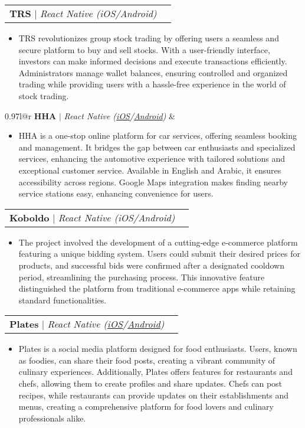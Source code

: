 \documentclass[letterpaper,11pt]{article}
\makeatletter
\newcommand{\resumeItem}[1]{
  \item\small{
    {#1 \vspace{-2pt}}
  }
}
\newcommand{\resumeProjectHeading}[2]{
    \vspace{-2pt}\item
    \begin{tabular*}{0.97\textwidth}{l@{\extracolsep{\fill}}r}
      \small#1 & #2 \\
    \end{tabular*}\vspace{-7pt}
}
\newcommand{\resumeItemListStart}{\begin{itemize}}
\newcommand{\resumeItemListEnd}{\end{itemize}\vspace{-5pt}}
\makeatother
\begin{document}
    \resumeProjectHeading
        {\textbf{TRS} $|$ \emph{{React Native (iOS/Android)}}}{}
          \resumeItemListStart
            \resumeItem{TRS revolutionizes group stock trading by offering users a seamless and secure platform to buy and sell stocks. With a user-friendly interface, investors can make informed decisions and execute transactions efficiently. Administrators manage wallet balances, ensuring controlled and organized trading while providing users with a hassle-free experience in the world of stock trading.}
          \resumeItemListEnd

    \resumeProjectHeading
        {\textbf{HHA} $|$ \emph{{React Native (\href{https://apps.apple.com/tj/app/id6443904394}{\color{blue}iOS}/\href{https://play.google.com/store/apps/details?id=com.hha.redak&hl=en&gl=US}{\color{blue}Android}})}}{}
          \resumeItemListStart
            \resumeItem{HHA is a one-stop online platform for car services, offering seamless booking and management. It bridges the gap between car enthusiasts and specialized services, enhancing the automotive experience with tailored solutions and exceptional customer service. Available in English and Arabic, it ensures accessibility across regions. Google Maps integration makes finding nearby service stations easy, enhancing convenience for users.}
          \resumeItemListEnd


    \resumeProjectHeading
        {\textbf{Koboldo} $|$ \emph{{React Native (iOS/Android)}}}{}
          \resumeItemListStart
            \resumeItem{The project involved the development of a cutting-edge e-commerce platform featuring a unique bidding system. Users could submit their desired prices for products, and successful bids were confirmed after a designated cooldown period, streamlining the purchasing process. This innovative feature distinguished the platform from traditional e-commerce apps while retaining standard functionalities.}
          \resumeItemListEnd
          
    \resumeProjectHeading
        {\textbf{Plates} $|$ \emph{{React Native (\href{https://apps.apple.com/us/app/plates-social/id1240670722}{\color{blue}iOS}/\href{https://play.google.com/store/apps/details?id=com.platessocial.app}{\color{blue}Android}})}}{}
          \resumeItemListStart
            \resumeItem{Plates is a social media platform designed for food enthusiasts. Users, known as foodies, can share their food posts, creating a vibrant community of culinary experiences. Additionally, Plates offers features for restaurants and chefs, allowing them to create profiles and share updates. Chefs can post recipes, while restaurants can provide updates on their establishments and menus, creating a comprehensive platform for food lovers and culinary professionals alike.}
          \resumeItemListEnd
          
\end{document}
